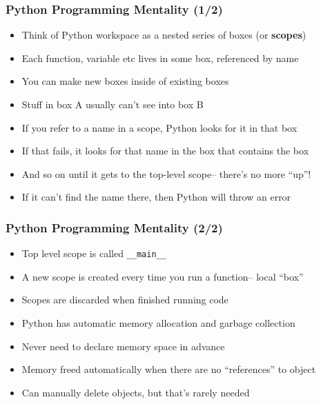\documentclass[aspectratio=169]{beamer}
\begin{document}
\begin{frame}
\frametitle{Python Programming Mentality (1/2)}

\begin{itemize}
	\item Think of Python workspace as a nested series of boxes (or \textbf{scopes})
	
	\item Each function, variable etc lives in some box, referenced by name
	
	\item <2->You can make new boxes inside of existing boxes
	
	\item <2->Stuff in box A usually can't see into box B
	
	\item <3->If you refer to a name in a scope, Python looks for it in that box
	
	\item <3->If that fails, it looks for that name in the box that contains the box
	
	\item <4->And so on until it gets to the top-level scope-- there's no more ``up''!
	
	\item <4->If it can't find the name there, then Python will throw an error
\end{itemize}
\end{frame}


\begin{frame}
\frametitle{Python Programming Mentality (2/2)}

\begin{itemize}
	\item Top level scope is called \texttt{\_\_main\_\_}
	
	\item A new scope is created every time you run a function-- local ``box''
	
	\item Scopes are discarded when finished running code
	
	\item <2->Python has automatic memory allocation and garbage collection
	
	\item <2->Never need to declare memory space in advance
	
	\item <3->Memory freed automatically when there are no ``references'' to object
	
	\item <3->Can manually delete objects, but that's rarely needed
\end{itemize}

\end{frame}
\end{document}
